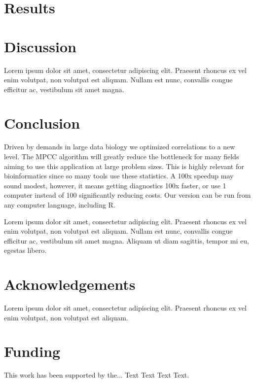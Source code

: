 \documentclass{bioinfo}
\begin{document}
\section{Results}

\section{Discussion}

Lorem ipsum dolor sit amet, consectetur adipiscing elit. Praesent 
rhoncus ex vel enim volutpat, non volutpat est aliquam. Nullam est 
nunc, convallis congue efficitur ac, vestibulum sit amet magna.

\section{Conclusion}

Driven by demands in large data biology we optimized correlations to a new level. 
The MPCC algorithm will greatly reduce the bottleneck for many fields aiming to 
use this application at large problem sizes. This is highly relevant for 
bioinformatics since so many tools use these statistics. A 100x speedup may sound
modest, however, it means getting diagnostics 100x faster, or use 1 computer 
instead of 100 significantly reducing costs. Our version can be run from any 
computer language, including R.

Lorem ipsum dolor sit amet, consectetur adipiscing elit. Praesent 
rhoncus ex vel enim volutpat, non volutpat est aliquam. Nullam est 
nunc, convallis congue efficitur ac, vestibulum sit amet magna. 
Aliquam ut diam sagittis, tempor mi eu, egestas libero.

\section*{Acknowledgements}

Lorem ipsum dolor sit amet, consectetur adipiscing elit. Praesent 
rhoncus ex vel enim volutpat, non volutpat est aliquam.
\vspace*{-12pt}

\section*{Funding}

This work has been supported by the... Text Text  Text Text.\vspace*{-12pt}


%
%
%
%

%

\end{document}
